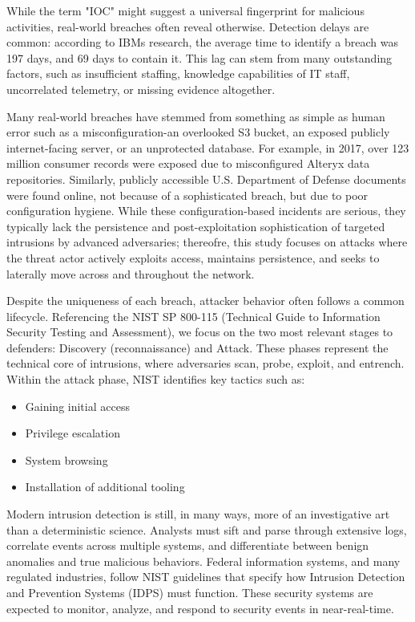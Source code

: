 While the term "IOC" might suggest a universal fingerprint for malicious activities, real-world breaches often reveal otherwise. Detection delays are common: according to IBMs research, the average time to identify a breach was 197 days, and 69 days to contain it. This lag can stem from many outstanding factors, such as insufficient staffing, knowledge capabilities of IT staff, uncorrelated telemetry, or missing evidence altogether.

Many real-world breaches have stemmed from something as simple as human error such as a misconfiguration-an overlooked S3 bucket, an exposed publicly internet-facing server, or an unprotected database. For example, in 2017, over 123 million consumer records were exposed due to misconfigured Alteryx data repositories. Similarly, publicly accessible U.S. Department of Defense documents were found online, not because of a sophisticated breach, but due to poor configuration hygiene. While these configuration-based incidents are serious, they typically lack the persistence and post-exploitation sophistication of targeted intrusions by advanced adversaries; thereofre, this study focuses on attacks where the threat actor actively exploits access, maintains persistence, and seeks to laterally move across and throughout the network.

Despite the uniqueness of each breach, attacker behavior often follows a common lifecycle. Referencing the NIST SP 800-115 (Technical Guide to Information Security Testing and Assessment), we focus on the two most relevant stages to defenders: Discovery (reconnaissance) and Attack. These phases represent the technical core of intrusions, where adversaries scan, probe, exploit, and entrench. Within the attack phase, NIST identifies key tactics such as:
\begin{itemize}
    \item Gaining initial access
    \item Privilege escalation
    \item System browsing
    \item Installation of additional tooling
\end{itemize}
Modern intrusion detection is still, in many ways, more of an investigative art than a deterministic science. Analysts must sift and parse through extensive logs, correlate events across multiple systems, and differentiate between benign anomalies and true malicious behaviors. Federal information systems, and many regulated industries, follow NIST guidelines that specify how Intrusion Detection and Prevention Systems (IDPS) must function. These security systems are expected to monitor, analyze, and respond to security events in near-real-time.

